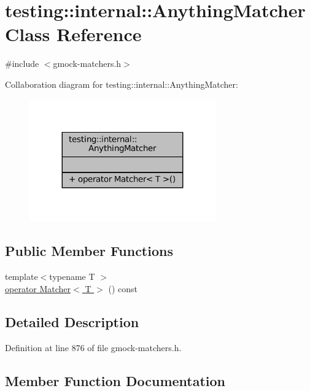 \hypertarget{classtesting_1_1internal_1_1AnythingMatcher}{}\section{testing\+:\+:internal\+:\+:Anything\+Matcher Class Reference}
\label{classtesting_1_1internal_1_1AnythingMatcher}


{\ttfamily \#include $<$gmock-\/matchers.\+h$>$}



Collaboration diagram for testing\+:\+:internal\+:\+:Anything\+Matcher\+:
\nopagebreak
\begin{figure}[H]
\begin{center}
\leavevmode
\includegraphics[width=227pt]{classtesting_1_1internal_1_1AnythingMatcher__coll__graph}
\end{center}
\end{figure}
\subsection*{Public Member Functions}
\begin{DoxyCompactItemize}
\item 
{\footnotesize template$<$typename T $>$ }\\\hyperlink{classtesting_1_1internal_1_1AnythingMatcher_ae98ebd3352f996a7fb01679917365474}{operator Matcher$<$ T $>$} () const
\end{DoxyCompactItemize}


\subsection{Detailed Description}


Definition at line 876 of file gmock-\/matchers.\+h.



\subsection{Member Function Documentation}
\mbox{\label{classtesting_1_1internal_1_1AnythingMatcher_ae98ebd3352f996a7fb01679917365474}} 
